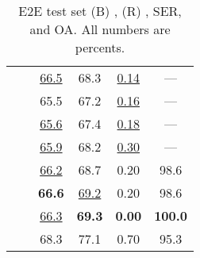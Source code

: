 \begin{table}[t!]
\begin{tabular}{ll cccc}
    \midrule
    \parbox[t]{2mm}{}
     &   & \uline{66.5} & 68.3 & \uline{0.14} & --- \\
     &   & 65.5 & 67.2 & \uline{0.16} & --- \\
     &   & \uline{65.6} & 67.4 & \uline{0.18} & --- \\
     &   & \uline{65.9} & 68.2 & \uline{0.30} & --- \\
     &   & \uline{66.2} & 68.7 & 0.20 & 98.6 \\
     &   & \textbf{66.6} & \uline{69.2} & 0.20 & 98.6 \\
     &   & \uline{66.3} & \textbf{69.3} & \textbf{0.00} & \textbf{100.0} \\
     &   & 68.3 & 77.1 & 0.70 & 95.3 \\
    \bottomrule
\end{tabular}



\caption{E2E test set (B) \bleu, (R) \rougel, SER, and OA. All numbers are percents. }
\label{tab:main.e2e.test}
\end{table}
